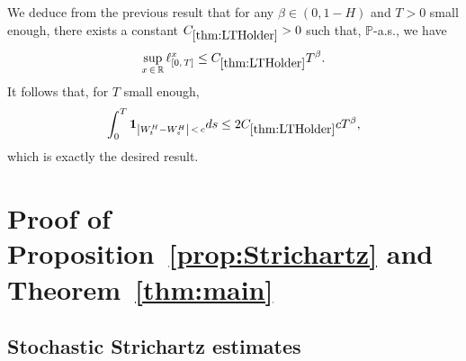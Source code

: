 \documentclass[AHL,Unicode,longabstracts,published]{cedram}
\newcommand{\bbP}{\mathbb{P}}
\newcommand{\bbR}{\mathbb{R}}
\newcommand{\bfun}{\mathbf{1}}
\begin{document}
We deduce from the previous result that for any $\beta\in (0,1-H)$ and $T>0$ small enough, there exists a constant $C_{\ref{thm:LTHolder}}>0$ such that, $\bbP$-a.s., we have
\[
\sup_{x\,\in\,\bbR} \ell^x_{[0,\,T]} \leq C_{\ref{thm:LTHolder}} T^{\beta}.
\]
It follows that, for $T$ small enough,
\[
\int_0^T \bfun_{\left|W_t^H-W_s^H\right|\,<\,c}ds \leq 2 C_{\ref{thm:LTHolder}} c T^{\beta},
\]
which is exactly the desired result.


\section{Proof of Proposition~\ref{prop:Strichartz} and Theorem~\ref{thm:main}}\label{sec:proofThmMain}

\subsection{Stochastic Strichartz estimates}
\end{document}
